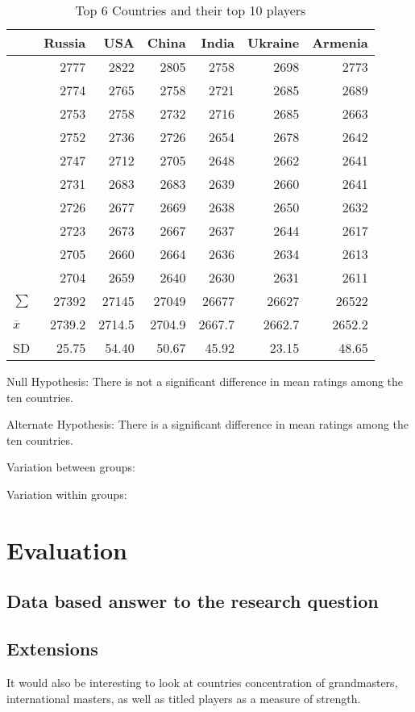 \documentclass[12pt]{article}
\begin{document}
\begin{table}
\begin{center}
\begin{tabular}{lrrrrrr}
 & Russia & USA & China & India & Ukraine & Armenia\\
\hline
 & 2777 & 2822 & 2805 & 2758 & 2698 & 2773\\
 & 2774 & 2765 & 2758 & 2721 & 2685 & 2689\\
 & 2753 & 2758 & 2732 & 2716 & 2685 & 2663\\
 & 2752 & 2736 & 2726 & 2654 & 2678 & 2642\\
 & 2747 & 2712 & 2705 & 2648 & 2662 & 2641\\
 & 2731 & 2683 & 2683 & 2639 & 2660 & 2641\\
 & 2726 & 2677 & 2669 & 2638 & 2650 & 2632\\
 & 2723 & 2673 & 2667 & 2637 & 2644 & 2617\\
 & 2705 & 2660 & 2664 & 2636 & 2634 & 2613\\
 & 2704 & 2659 & 2640 & 2630 & 2631 & 2611\\
\(\sum\) & 27392 & 27145 & 27049 & 26677 & 26627 & 26522\\
 \(\overline{x}\) & 2739.2 & 2714.5 & 2704.9 & 2667.7 & 2662.7 & 2652.2\\
SD & 25.75 & 54.40 & 50.67 & 45.92 & 23.15 & 48.65\\
\end{tabular}
\caption{Top 6 Countries and their top 10 players}
\end{center}
\end{table}

Null Hypothesis: There is not a significant difference in mean ratings among the ten countries. 

Alternate Hypothesis: There is a significant difference in mean ratings among the ten countries. 

Variation between groups:

Variation within groups:


\section{Evaluation}
\subsection{Data based answer to the research question}
\subsection{Extensions}
It would also be interesting to look at countries concentration of grandmasters, international masters, as well as titled players as a measure of strength. 
\end{document}
